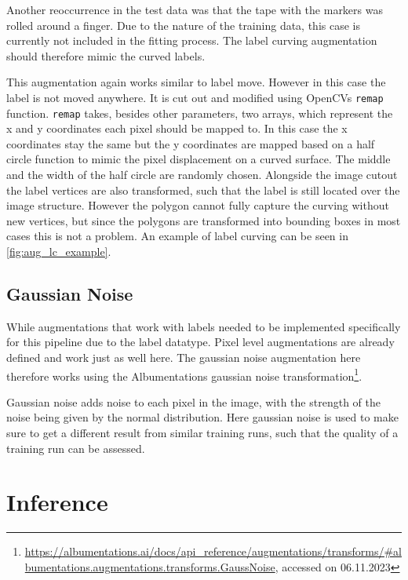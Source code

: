 \documentclass[10pt]{book}
\begin{document}
Another reoccurrence in the test data was that the tape with the markers was rolled around a finger. Due to the nature of the training data, this case is currently not included in the fitting process. The label curving augmentation should therefore mimic the curved labels.

This augmentation again works similar to label move. However in this case the label is not moved anywhere. It is cut out and modified using \acp{OpenCV} \texttt{remap} function. \texttt{remap} takes, besides other parameters, two arrays, which represent the x and y coordinates each pixel should be mapped to. In this case the x coordinates stay the same but the y coordinates are mapped based on a half circle function to mimic the pixel displacement on a curved surface. The middle and the width of the half circle are randomly chosen. Alongside the image cutout the label vertices are also transformed, such that the label is still located over the image structure. However the polygon cannot fully capture the curving without new vertices, but since the polygons are transformed into bounding boxes in most cases this is not a problem. An example of label curving can be seen in \autoref{fig:aug_lc_example}.

\subsection{Gaussian Noise}

While augmentations that work with labels needed to be implemented specifically for this pipeline due to the label datatype. Pixel level augmentations are already defined and work just as well here. The gaussian noise augmentation here therefore works using the Albumentations gaussian noise transformation\footnote{\url{https://albumentations.ai/docs/api\_reference/augmentations/transforms/\#albumentations.augmentations.transforms.GaussNoise}, accessed on 06.11.2023}. 

Gaussian noise adds noise to each pixel in the image, with the strength of the noise being given by the normal distribution. Here gaussian noise is used to make sure to get a different result from similar training runs, such that the quality of a training run can be assessed.


\section{Inference}
\end{document}
